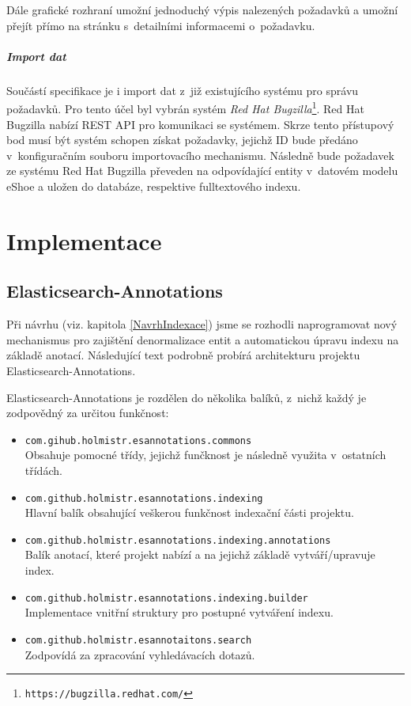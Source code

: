 \documentclass[11pt,oneside]{fithesis2}
\begin{document}
Dále grafické rozhraní umožní jednoduchý výpis nalezených požadavků a umožní přejít přímo na stránku s~detailními informacemi o~požadavku.

\subparagraph{Import dat}
Součástí specifikace je i import dat z~již existujícího systému pro správu požadavků. Pro tento účel byl vybrán systém \emph{Red Hat Bugzilla}\footnote{\texttt{https://bugzilla.redhat.com/}}. Red Hat Bugzilla nabízí REST API pro komunikaci se systémem. Skrze tento přístupový bod musí být systém schopen získat požadavky, jejichž ID bude předáno v~konfiguračním souboru importovacího mechanismu. Následně bude požadavek ze systému Red Hat Bugzilla převeden na odpovídající entity v~datovém modelu eShoe a uložen do databáze, respektive fulltextového indexu.

\section{Implementace}

\subsection{Elasticsearch-Annotations}
Při návrhu (viz. kapitola \ref{NavrhIndexace}) jsme se rozhodli naprogramovat nový mechanismus pro zajištění denormalizace entit a automatickou úpravu indexu na základě anotací. Následující text podrobně probírá architekturu projektu Elasticsearch-Annotations. 

Elasticsearch-Annotations je rozdělen do několika balíků, z~nichž každý je zodpovědný za určitou funkčnost:
\begin{itemize}
	\item \texttt{com.gihub.holmistr.esannotations.commons} \\
		Obsahuje pomocné třídy, jejichž funčknost je následně využita v~ostatních třídách.

	\item \texttt{com.github.holmistr.esannotations.indexing} \\
		Hlavní balík obsahující veškerou funkčnost indexační části projektu.

	\item \texttt{com.github.holmistr.esannotations.indexing.annotations} \\
		Balík anotací, které projekt nabízí a na jejichž základě vytváří/upravuje index.

	\item \texttt{com.github.holmistr.esannotations.indexing.builder} \\
		Implementace vnitřní struktury pro postupné vytváření indexu.

	\item \texttt{com.github.holmistr.esannotaitons.search} \\
		Zodpovídá za zpracování vyhledávacích dotazů.		 
\end{itemize}
\end{document}
